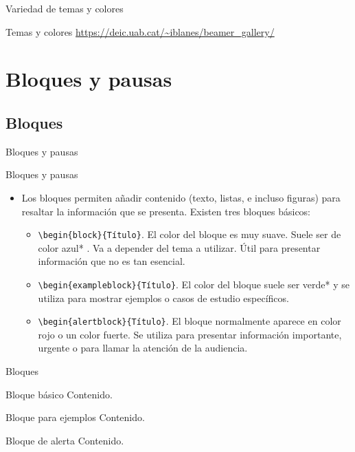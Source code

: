 \documentclass[aspectratio=169, 10pt]{beamer}
\begin{document}
\begin{frame}{Variedad de temas y colores}
	\begin{exampleblock}{Temas y colores}
		\url{https://deic.uab.cat/~iblanes/beamer_gallery/}
	\end{exampleblock}
\end{frame}

\section{Bloques y pausas}
\subsection{Bloques}
\begin{frame}[fragile]{Bloques y pausas} 
    \begin{alertblock}{Bloques y pausas} \pause
        \begin{itemize}
            \item Los bloques permiten añadir contenido (texto, listas, e incluso figuras) para resaltar la información que se presenta. Existen tres bloques básicos: \pause
            \begin{itemize}
                \item \verb|\begin{block}{Título}|. El color del bloque es muy suave. Suele ser de color azul* . Va a depender del tema a utilizar. Útil para presentar información que no es tan esencial. \pause
                \item \verb|\begin{exampleblock}{Título}|. El color del bloque suele ser verde* y se utiliza para mostrar ejemplos o casos de estudio específicos. \pause 
                \item \verb|\begin{alertblock}{Título}|. El bloque normalmente aparece en color rojo o un color fuerte. Se utiliza para presentar información importante, urgente o para llamar la atención de la audiencia.
            \end{itemize}
            
        \end{itemize}
        
    \end{alertblock}
\end{frame}


\begin{frame}{Bloques}
    \begin{block}{Bloque básico} \pause
        Contenido.
    \end{block}

    \begin{exampleblock}{Bloque para ejemplos} \pause
        Contenido.
    \end{exampleblock}

    \begin{alertblock}{Bloque de alerta} \pause
        Contenido.
    \end{alertblock}
\end{frame}
\end{document}
